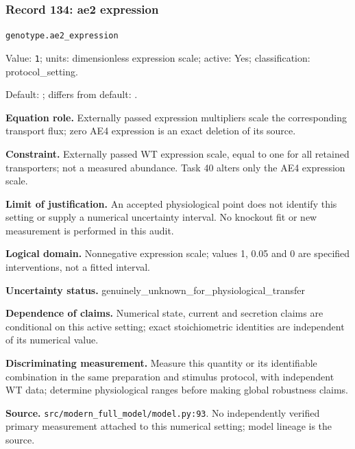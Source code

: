 \subsubsection*{Record 134: ae2 expression}
{\small \nolinkurl{genotype.ae2_expression}\par

Value: \texttt{1}; units: dimensionless expression scale; active: Yes; classification: protocol\_setting.\par

Default: ; differs from default: .\par

\textbf{Equation role.} Externally passed expression multipliers scale the corresponding transport flux; zero AE4 expression is an exact deletion of its source.\par

\textbf{Constraint.} Externally passed WT expression scale, equal to one for all retained transporters; not a measured abundance. Task 40 alters only the AE4 expression scale.\par

\textbf{Limit of justification.} An accepted physiological point does not identify this setting or supply a numerical uncertainty interval. No knockout fit or new measurement is performed in this audit.\par

\textbf{Logical domain.} Nonnegative expression scale; values 1, 0.05 and 0 are specified interventions, not a fitted interval.\par

\textbf{Uncertainty status.} genuinely\_unknown\_for\_physiological\_transfer\par

\textbf{Dependence of claims.} Numerical state, current and secretion claims are conditional on this active setting; exact stoichiometric identities are independent of its numerical value.\par

\textbf{Discriminating measurement.} Measure this quantity or its identifiable combination in the same preparation and stimulus protocol, with independent WT data; determine physiological ranges before making global robustness claims.\par

\textbf{Source.} \nolinkurl{src/modern_full_model/model.py:93}. No independently verified primary measurement attached to this numerical setting; model lineage is the source.\par}

